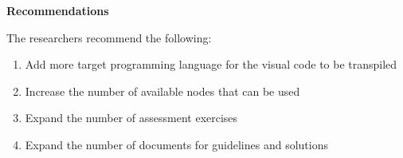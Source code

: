 \flushleft
\textbf{Recommendations}
\justifying

The researchers recommend the following:

\begin{enumerate}
	\item Add more target programming language for the visual code to be transpiled
	\item Increase the number of available nodes that can be used
	\item Expand the number of assessment exercises
	\item Expand the number of documents for guidelines and solutions
\end{enumerate}
